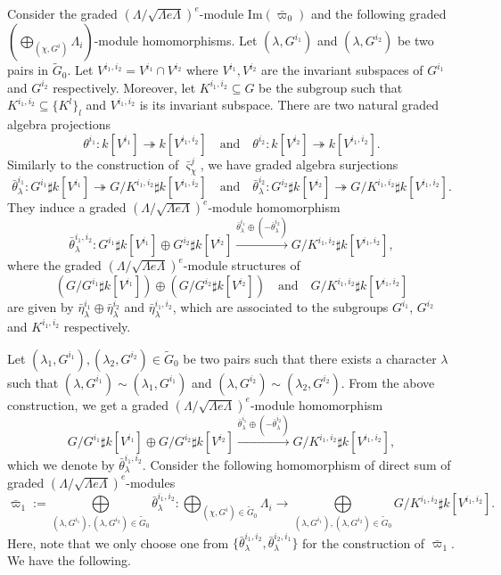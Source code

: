 \documentclass[11pt,reqno]{amsart}
\theoremstyle{definition}
\begin{document}
Consider the graded
$(\Lambda/\sqrt{\Lambda e \Lambda})^e$-module $\mathrm{Im}(\bar{\varpi}_0)$ 
and the following graded $(\bigoplus\limits_{(\chi, G^i)} \Lambda_{i})$-module homomorphisms. 
Let $(\lambda, G^{i_1})$ and $(\lambda, G^{i_2})$ be two pairs in $\tilde{G}_0$.
Let $V^{i_1, i_2} = V^{i_1} \cap V^{i_2}$ where 
$V^{i_1}, V^{i_2}$ are the invariant subspaces of $G^{i_1}$ and $G^{i_2}$ 
respectively. Moreover, let $K^{i_1, i_2} \subseteq G$ be the subgroup such 
that $K^{i_1, i_2} \subseteq \{ K^l \}_l$ and $V^{i_1, i_2}$ 
is its invariant subspace. 
There are two natural graded 
algebra projections 
$$\theta^{i_1} : k[V^{i_1}] 
\twoheadrightarrow k[V^{i_1, i_2}]\quad\mbox{and}\quad
\theta^{i_2} : k[V^{i_2}] \twoheadrightarrow k[V^{i_1, 
i_2}].$$
Similarly to the construction 
of $\bar\varsigma^{j}_{\chi}$, we have graded 
algebra surjections 
$$\bar\theta^{i_1}_{\lambda}: G^{i_1} \sharp k[V^{i_1}] 
\twoheadrightarrow G / K^{i_1, i_2} \sharp k[V^{i_1, i_2}]
\quad\mbox{and}\quad
\bar\theta^{i_2}_{\lambda}:  G^{i_2} \sharp k[V^{i_2}] 
\twoheadrightarrow G / K^{i_1, i_2} \sharp k[V^{i_1, 
i_2}].$$
They induce a graded 
$(\Lambda / \sqrt{\Lambda e \Lambda})^e$-module
homomorphism 
$$
\bar\theta^{i_1, i_2}_\lambda :  G^{i_1} \sharp k[V^{i_1}] 
\oplus  G^{i_2} \sharp k[V^{i_2}] 
\xrightarrow{\bar\theta^{i_1}_{\lambda} 
\oplus (-\bar\theta^{i_2}_{\lambda})} 
G / K^{i_1, i_2} \sharp k[V^{i_1, i_2}],
$$
where the graded
$(\Lambda / \sqrt{\Lambda e \Lambda})^e$-module structures
of $$(G /G^{i_1} \sharp k[V^{i_1}]) 
\oplus(G /G^{i_2} \sharp k[V^{i_2}])\quad
\mbox{and}
\quad
G /K^{i_1, i_2} \sharp k[V^{i_1, i_2}]$$ are given by 
$\bar{\eta}^{i_1}_{\lambda} \oplus 
\bar{\eta}^{i_2}_{\lambda}$ and $ \bar{\eta}^{i_1, 
i_2}_{\lambda}$, 
which are associated to
the
subgroups $G^{i_1}$, $G^{i_2}$ and $K^{i_1, i_2}$ respectively. 

Let $(\lambda_1, G^{i_1}), (\lambda_2, G^{i_2}) \in \tilde{G}_0$ be 
two pairs such that there exists a character 
$\lambda$ such that $(\lambda, G^{i_1}) \sim (\lambda_1, G^{i_1})$
and $(\lambda, G^{i_2}) \sim (\lambda_2, G^{i_2})$. From the above construction, 
we get 
a graded $(\Lambda / \sqrt{\Lambda e \Lambda})^e$-module
homomorphism 
$$
G /G^{i_1} \sharp k[V^{i_1}] \oplus G /G^{i_2} \sharp k[V^{i_2}] 
\xrightarrow{\bar\theta^{i_1}_{\lambda} \oplus 
(-\bar\theta^{i_2}_{\lambda})} G /K^{i_1, i_2} \sharp k[V^{i_1, i_2}],
$$ 
which we denote by $\bar\theta^{i_1, i_2}_{\lambda}$. 
Consider the following homomorphism of direct sum of 
graded $(\Lambda / \sqrt{\Lambda e \Lambda})^e$-modules 
$$
\bar{\varpi}_1 := \bigoplus\limits_{(\lambda, G^{i_1}), (\lambda, G^{i_2}) \in \tilde{G}_0} 
\bar\theta^{i_1, i_2}_{\lambda}:  \bigoplus_{(\chi, G^i) \in \tilde{G}_0} \Lambda_i 
\rightarrow \bigoplus\limits_{(\lambda, G^{i_1}), (\lambda, G^{i_2}) \in \tilde{G}_0} G 
/ K^{i_1, i_2} \sharp k[V^{i_1, i_2}]. 
$$
Here, note that we only choose one from $\{\bar\theta^{i_1, i_2}_{\lambda}, 
\bar\theta^{i_2, i_1}_{\lambda}\}$ for the construction of $\bar{\varpi}_1$. 
We have the following. 
\end{document}
